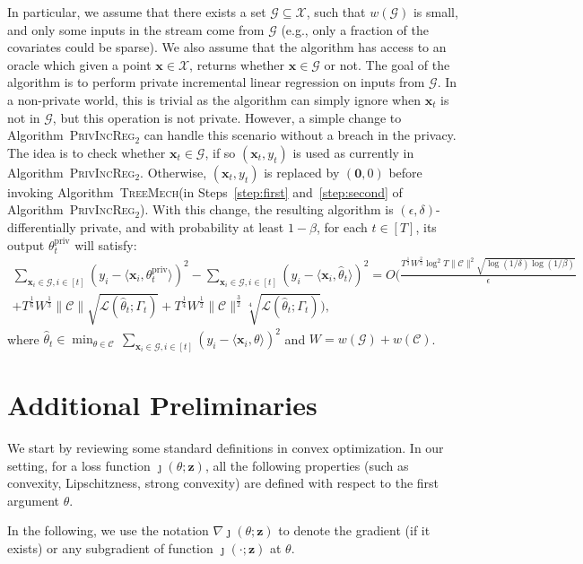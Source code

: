 \documentclass{article}
\theoremstyle{plain}
\def \TreeMech {\textsc{TreeMech}\xspace}
\def \ProjPrivIncReg {\textsc{PrivIncReg$_2$}\xspace}
\def \eps {\epsilon}
\def \z {\mathbf z}
\def \CCC {\mathcal{C}}
\def \GGG {\mathcal{G}}
\def \XXX {\mathcal{X}}
\def \LLL {\mathcal{L}}
\def \priv {{\mathrm{priv}}}
\def \x {\mathbf x}
\begin{document}
In particular, we assume that there exists a set $\GGG \subseteq \XXX$, such that $w(\GGG)$ is small, and only some inputs in the stream come from $\GGG$ (e.g., only a fraction of the covariates could be sparse). We also assume that the algorithm has access to an oracle which given a point $\x \in \XXX$, returns whether $\x \in \GGG$ or not. The goal of the algorithm is to perform private incremental linear regression on inputs from $\GGG$. In a non-private world, this is trivial as the algorithm can simply ignore when $\x_t$ is not in $\GGG$, but this operation is not private. However, a simple change to Algorithm~\ProjPrivIncReg can handle this scenario without a breach in the privacy. The idea is to check whether $\x_t \in \GGG$, if so $(\x_t,y_t)$ is used as currently in Algorithm~\ProjPrivIncReg. Otherwise, $(\x_t,y_t)$ is replaced by $(\mathbf{0},0)$ before invoking Algorithm~\TreeMech (in Steps~\ref{step:first} and~\ref{step:second} of Algorithm~\ProjPrivIncReg). With this change, the resulting algorithm is $(\eps,\delta)$-differentially private, and with probability at least $1-\beta$, for each $t \in [T]$, its output $\theta^\priv_t$ will satisfy:
\begin{multline*}
\sum_{\x_i \in \GGG, i \in [t]}(y_i - \langle \x_i, \theta^\priv_t \rangle)^2 -  \sum_{\x_i \in \GGG, i \in [t]}(y_i - \langle \x_i, \hat{\theta}_t \rangle)^2 
 = O(\frac{T^{\frac 1 3} W^{\frac 2 3} \log^{2} T \| \CCC \|^2  \sqrt{\log(1/\delta) \log(1/\beta)}}{\eps} \\ 
+ T^{\frac 1 6}W^{\frac 1 3} \| \CCC \|\sqrt{\LLL(\hat{\theta}_t;\Gamma_t)} + T^{\frac 1 4}W^{\frac 1 2} \| \CCC \|^{\frac 3 2} \sqrt[4]{\LLL(\hat{\theta}_t;\Gamma_t)}),
\end{multline*}
where $\hat{\theta}_t \in \min_{\theta \in \CCC}\, \sum_{\x_i \in \GGG, i \in [t]}(y_i - \langle \x_i, \theta \rangle)^2$ and $W=w(\GGG)+w(\CCC)$.



\appendix

\section{Additional Preliminaries} \label{app:convex}
We start by reviewing some standard definitions in convex optimization. In our setting, for a loss function $\jmath(\theta;\z)$, all the following properties (such as convexity, Lipschitzness, strong convexity) are defined with respect to the first argument $\theta$.

In the following, we use the notation $\nabla \jmath(\theta;\z)$ to denote the gradient (if it exists) or any subgradient of function $\jmath(\cdot;\z)$ at $\theta$. 
\end{document}
